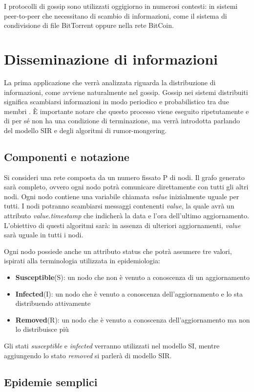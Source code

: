 I protocolli di gossip sono utilizzati oggigiorno in numerosi contesti: in sistemi peer-to-peer che necessitano di scambio di informazioni, come il sistema di condivisione di file BitTorrent \cite{bittorrent} oppure nella rete BitCoin.

\section{Disseminazione di informazioni}
La prima applicazione che verrà analizzata riguarda la distribuzione di informazioni, come avviene naturalmente nel gossip. Gossip nei sistemi distribuiti significa scambiarsi informazioni in modo periodico e probabilistico tra due membri \cite{kermarrec}. È importante notare che questo processo viene eseguito ripetutamente e di per sé non ha una condizione di terminazione, ma verrà introdotta parlando del modello SIR e degli algoritmi di rumor-mongering.
\subsection{Componenti e notazione}
Si consideri una rete composta da un numero fissato P di nodi. Il grafo generato sarà completo, ovvero ogni nodo potrà comunicare direttamente con tutti gli altri nodi. Ogni nodo contiene una variabile chiamata \textit{value} inizialmente uguale per tutti. I nodi potranno scambiarsi messaggi contenenti \textit{value}, la quale avrà un attributo \textit{value.timestamp} che indicherà la data e l'ora dell'ultimo aggiornamento. L'obiettivo di questi algoritmi sarà: in assenza di ulteriori aggiornamenti, \textit{value} sarà uguale in tutti i nodi.

Ogni nodo possiede anche un attributo status che potrà assumere tre valori, ispirati alla terminologia utilizzata in epidemiologia:
\begin{itemize}
    \item \textbf{Susceptible}(S): un nodo che non è venuto a conoscenza di un aggiornamento
    \item \textbf{Infected}(I): un nodo che è venuto a conoscenza dell'aggiornamento e lo sta distribuendo attivamente
    \item \textbf{Removed}(R): un nodo che è venuto a conoscenza dell'aggiornamento ma non lo distribuisce più
\end{itemize}
Gli stati \textit{susceptible} e \textit{infected} verranno utilizzati nel modello SI, mentre aggiungendo lo stato \textit{removed} si parlerà di modello SIR.
\subsection{Epidemie semplici}

